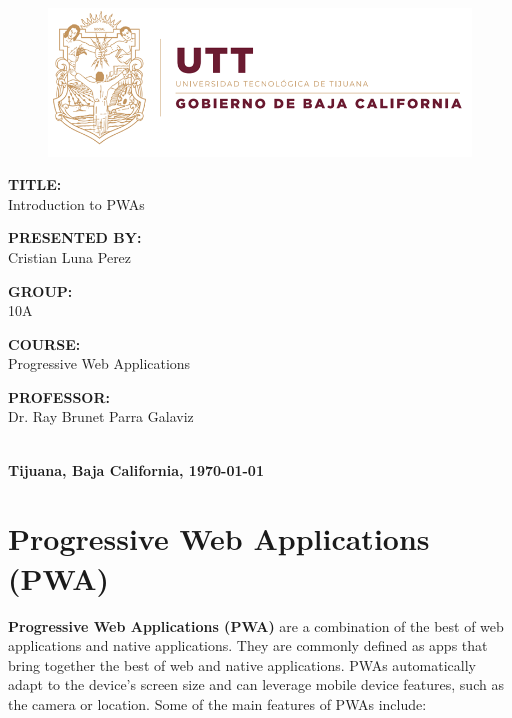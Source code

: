 \documentclass[12pt]{article}
\begin{document}
	\begin{titlepage}
		\begin{center}
			\begin{figure}
				\centering
				\includegraphics[width=0.6\linewidth]{img/UTT}
			\end{figure}

			\Huge
			\textbf{TITLE:}\\
			Introduction to PWAs
			
			\vspace{1cm}
			
			\LARGE
			\textbf{PRESENTED BY:}\\
			Cristian Luna Perez
			
			\vspace{1cm}
			
			\textbf{GROUP:}\\
			10A
			
			\vspace{1cm}
			
			\textbf{COURSE:}\\
			Progressive Web Applications
			
			\vspace{1cm}
			
			\textbf{PROFESSOR:}\\
			Dr. Ray Brunet Parra Galaviz
			
			\vspace{0.2cm}
			
			\textbf{\\Tijuana, Baja California, \today}
			
		\end{center}
	\end{titlepage}
	\section{Progressive Web Applications (PWA)}
	\textbf{Progressive Web Applications (PWA)} are a combination of the best of web applications and native applications. They are commonly defined as apps that bring together the best of web and native applications. PWAs automatically adapt to the device's screen size and can leverage mobile device features, such as the camera or location. Some of the main features of PWAs include:
	
\end{document}
